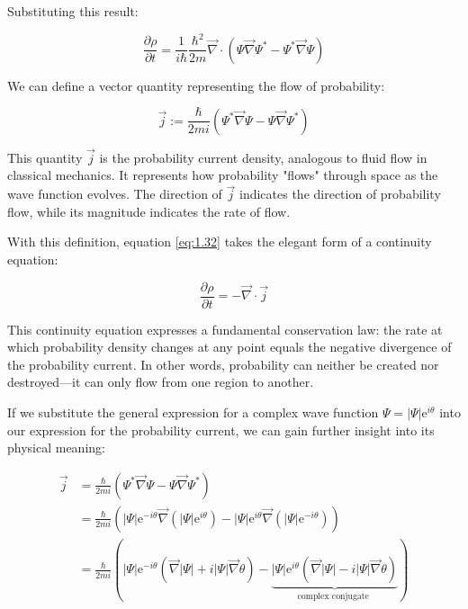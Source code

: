 \documentclass[italian]{HKNdocument}
\begin{document}
Substituting this result:

\begin{equation}
\frac{\partial \rho}{\partial t}=\frac{1}{i\hbar}\frac{\hbar^{2}}{2 m} \vec{\nabla} \cdot\left(\Psi \vec{\nabla} \Psi^{*}-\Psi^{*} \vec{\nabla} \Psi\right) \label{eq:1.32}
\end{equation}

We can define a vector quantity representing the flow of probability:

\begin{equation}
\vec{j}:=\frac{\hbar}{2 m i}\left(\Psi^{*} \vec{\nabla} \Psi-\Psi \vec{\nabla} \Psi^{*}\right)
\end{equation}

This quantity $\vec{j}$ is the probability current density, analogous to fluid flow in classical mechanics. It represents how probability "flows" through space as the wave function evolves. The direction of $\vec{j}$ indicates the direction of probability flow, while its magnitude indicates the rate of flow.

With this definition, equation \eqref{eq:1.32} takes the elegant form of a continuity equation:

\begin{equation}
\frac{\partial \rho}{\partial t}=-\vec{\nabla} \cdot \vec{j}
\end{equation}

This continuity equation expresses a fundamental conservation law: the rate at which probability density changes at any point equals the negative divergence of the probability current. In other words, probability can neither be created nor destroyed—it can only flow from one region to another.


If we substitute the general expression for a complex wave function $\Psi=|\Psi| \mathrm{e}^{i \theta}$ into our expression for the probability current, we can gain further insight into its physical meaning:

\begin{align}
\vec{j} &= \frac{\hbar}{2 m i}\left(\Psi^{*} \vec{\nabla} \Psi-\Psi \vec{\nabla} \Psi^{*}\right) \\
&= \frac{\hbar}{2 m i}\left(|\Psi| \mathrm{e}^{-i \theta} \vec{\nabla}\left(|\Psi| \mathrm{e}^{i \theta}\right)-|\Psi| \mathrm{e}^{i \theta} \vec{\nabla}\left(|\Psi| \mathrm{e}^{-i \theta}\right)\right) \\
&= \frac{\hbar}{2 m i}(|\Psi| \mathrm{e}^{-i \theta}(\vec{\nabla}|\Psi|+i|\Psi| \vec{\nabla} \theta)-\underbrace{|\Psi| \mathrm{e}^{i \theta}(\vec{\nabla}|\Psi|-i|\Psi| \vec{\nabla} \theta)}_{\text {complex conjugate }})  \\
\end{align}
\end{document}
